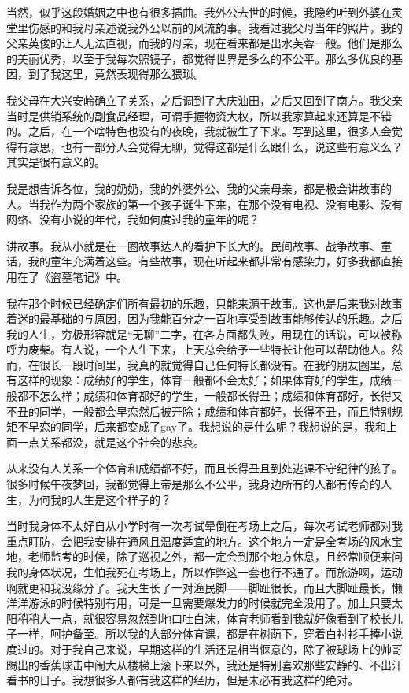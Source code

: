当然，似乎这段婚姻之中也有很多插曲。我外公去世的时候，我隐约听到外婆在灵堂里伤感的和我母亲述说我外公以前的风流韵事。我看过我父母当年的照片，我的父亲英俊的让人无法直视，而我的母亲，现在看来都是出水芙蓉一般。他们是那么的美丽优秀，以至于我每次照镜子，都觉得世界是多么的不公平。那么多优良的基因，到了我这里，竟然表现得那么猥琐。

我父母在大兴安岭确立了关系，之后调到了大庆油田，之后又回到了南方。我父亲当时是供销系统的副食品经理，可谓手握物资大权，所以我家算起来还算是不错的。之后，在一个啥特色也没有的夜晚，我就被生了下来。写到这里，很多人会觉得有意思，也有一部分人会觉得无聊，觉得这都是什么跟什么，说这些有意义么？其实是很有意义的。

我是想告诉各位，我的奶奶，我的外婆外公、我的父亲母亲，都是极会讲故事的人。当我作为两个家族的第一个孩子诞生下来，在那个没有电视、没有电影、没有网络、没有小说的年代，我如何度过我的童年的呢？

讲故事。我从小就是在一圈故事达人的看护下长大的。民间故事、战争故事、童话，我的童年充满着这些。有些故事，现在听起来都非常有感染力，好多我都直接用在了《盗墓笔记》中。

我在那个时候已经确定们所有最初的乐趣，只能来源于故事。这也是后来我对故事着迷的最基础的与原因，因为我能百分之一百地享受到故事能够传达的乐趣。之后我的人生，穷极形容就是“无聊”二字，在各方面都失败，用现在的话说，可以被称呼为废柴。有人说，一个人生下来，上天总会给予一些特长让他可以帮助他人。然而，在很长一段时间里，我真的就觉得自己任何特长都没有。在我的朋友圈里，总有这样的现象：成绩好的学生，体育一般都不会太好；如果体育好的学生，成绩一般都不怎么样；成绩和体育都好的学生，一般都长得丑；成绩和体育都好，长得又不丑的同学，一般都会早恋然后被开除；成绩和体育都好，长得不丑，而且特别规矩不早恋的同学，后来都变成了gay了。我想说的是什么呢？我想说的是，我和上面一点关系都没，就是这个社会的悲哀。

从来没有人关系一个体育和成绩都不好，而且长得丑且到处逃课不守纪律的孩子。很多时候午夜梦回，我都觉得上帝是那么不公平，我身边所有的人都有传奇的人生，为何我的人生是这个样子的？

当时我身体不太好自从小学时有一次考试晕倒在考场上之后，每次考试老师都对我重点盯防，会把我安排在通风且温度适宜的地方。这个地方一定是全考场的风水宝地，老师监考的时候，除了巡视之外，都一定会到那个地方休息，且经常顺便来问我的身体状况，生怕我死在考场上，所以作弊这一套也行不通了。而旅游啊，运动啊就更和我没缘分了。我天生长了一对渔民脚——脚趾很长，而且大脚趾最长，懒洋洋游泳的时候特别有用，可是一旦需要爆发力的时候就完全没用了。加上只要太阳稍稍大一点，就很容易忽然到地口吐白沫，体育老师看到我就好像看到了校长儿子一样，呵护备至。所以我的大部分体育课，都是在树荫下，穿着白衬衫手捧小说度过的。对于我自己来说，早期这样的生活还是相当惬意的，除了被球场上的帅哥踢出的香蕉球击中闹大从楼梯上滚下来以外，我还是特别喜欢那些安静的、不出汗看书的日子。我想很多人都有我这样的经历，但是未必有我这样的绝对。

